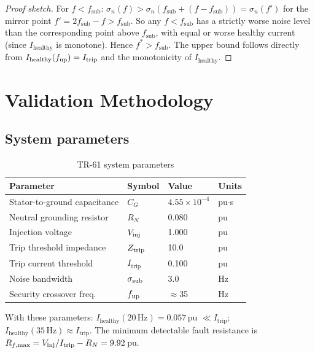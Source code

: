 \documentclass[11pt,a4paper]{article}
\newcommand{\Ihealthy}{I_{\mathrm{healthy}}}
\newcommand{\Itrip}{I_{\mathrm{trip}}}
\newcommand{\sigman}{\sigma_n}
\newcommand{\fopt}{f^*}
\newcommand{\fsub}{f_{\mathrm{sub}}}
\newcommand{\RN}{R_N}
\newcommand{\CG}{C_G}
\begin{document}
\begin{proof}[Proof sketch]
  For $f < \fsub$: $\sigman(f) > \sigman(\fsub + (f-\fsub)) = \sigman(f')$
  for the mirror point $f' = 2\fsub - f > \fsub$.  So any $f < \fsub$ has
  a strictly worse noise level than the corresponding point above $\fsub$,
  with equal or worse healthy current (since $\Ihealthy$ is monotone).
  Hence $\fopt > \fsub$.  The upper bound follows directly from
  $\Ihealthy(f_{\rm up}) = \Itrip$ and the monotonicity of $\Ihealthy$.
\end{proof}

\section{Validation Methodology}
\label{sec:validation}

\subsection{System parameters}
\label{sec:params}

\begin{table}[h]
\centering
\caption{TR-61 system parameters}
\label{tab:params}
\begin{tabular}{llll}
  \toprule
  Parameter & Symbol & Value & Units \\
  \midrule
  Stator-to-ground capacitance & $\CG$   & $4.55\times10^{-4}$ & pu$\cdot$s \\
  Neutral grounding resistor   & $\RN$   & 0.080 & pu \\
  Injection voltage            & $V_{\rm inj}$ & 1.000 & pu \\
  Trip threshold impedance     & $Z_{\rm trip}$ & 10.0 & pu \\
  Trip current threshold       & $\Itrip$ & 0.100 & pu \\
  Noise bandwidth              & $\sigma_{\rm sub}$ & 3.0 & Hz \\
  Security crossover freq.     & $f_{\rm up}$  & $\approx$35 & Hz \\
  \bottomrule
\end{tabular}
\end{table}

With these parameters: $\Ihealthy(20\,\mathrm{Hz}) = 0.057$\,pu $\ll \Itrip$;
$\Ihealthy(35\,\mathrm{Hz}) \approx \Itrip$.  The minimum detectable fault
resistance is $R_{f,\rm max} = V_{\rm inj}/\Itrip - \RN = 9.92$\,pu.
\end{document}
